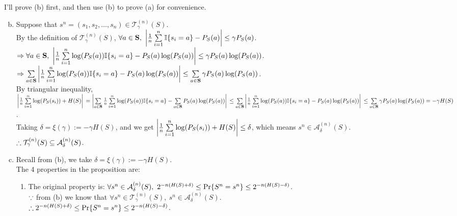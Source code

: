 \begin{pr}

\renewcommand{\S}{\textbf{S}}
\newcommand{\T}{{\mathcal{T}_\gamma^{(n)}(S)}}
\renewcommand{\A}{{\mathcal{A}_\delta^{(n)}(S)}}

I'll prove (b) first, and then use (b) to prove (a) for convenience.

\begin{enumerate}[(a)]

\setcounter{enumi}{1}

\item Suppose that $s^n=(s_1, s_2, \dots, s_n)\in\T$.\\
By the definition of $\T$, $\forall a\in\S,\ \left|\frac1n\suml_{i=1}^n\I\{s_i=a\}-P_S(a)\right|\leq\gamma P_S(a)$.\\
$\then\forall a\in\S,\ \left|\frac1n\suml_{i=1}^n\log(P_S(a))\I\{s_i=a\}-P_S(a)\log(P_S(a))\right|\leq\gamma P_S(a)\log(P_S(a))$.\\
$\then\suml_{a\in\S}\left|\frac1n\suml_{i=1}^n\log(P_S(a))\I\{s_i=a\}-P_S(a)\log(P_S(a))\right|\leq\suml_{a\in\S}\gamma P_S(a)\log(P_S(a))$.\\
By triangular inequality,\\
$\left|\frac1n\suml_{i=1}^n\log(P_S(s_i))+H(S)\right|\\
=\left|\suml_{a\in\S}\frac1n\suml_{i=1}^n\log(P_S(a))\I\{s_i=a\}-\suml_{a\in\S}P_S(a)\log(P_S(a))\right|\\
\leq\suml_{a\in\S}\left|\frac1n\suml_{i=1}^n\log(P_S(a))\I\{s_i=a\}-P_S(a)\log(P_S(a))\right|\\
\leq\suml_{a\in\S}\gamma P_S(a)\log(P_S(a))=-\gamma H(S)$.\\
Taking $\delta=\xi(\gamma):=-\gamma H(S)$, and we get $\left|\frac1n\sum\limits_{i=1}^n\log(P_S(s_i))+H(S)\right|\leq\delta$, which means $s^n\in\A$.\\
$\so\T\subseteq\A$.

\setcounter{enumi}{0}

\item Recall from (b), we take $\delta=\xi(\gamma):=-\gamma H(S)$.\\
The $4$ properties in the proposition are:

\begin{enumerate}[(1)]

\item The original property is: $\forall s^n\in\A,\ 2^{-n(H(S)+\delta)}\leq\P\{S^n=s^n\}\leq2^{-n(H(S)-\delta)}$.\\
$\because$ from (b) we know that $\forall s^n\in\T,\ s^n\in\A$.\\
$\therefore2^{-n(H(S)+\delta)}\leq\mathrm{Pr}\{S^n=s^n\}\leq2^{-n(H(S)-\delta)}$.


\end{enumerate}
\end{enumerate}
\end{pr}
